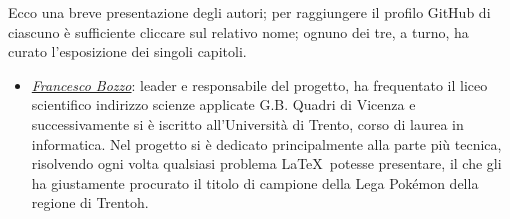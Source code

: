 \documentclass[class=book, crop=false, oneside]{standalone}
\begin{document}
Ecco una breve presentazione degli autori; per raggiungere il profilo GitHub di ciascuno è sufficiente cliccare sul relativo nome; ognuno dei tre, a turno, ha curato l'esposizione dei singoli capitoli.
\vskip 10pt
\begin{minipage}{.6\textwidth}
    \begin{itemize}
		\item \emph{\href{https://github.com/FrancescoBozzo}{Francesco Bozzo}}: leader e responsabile del progetto, ha frequentato il liceo scientifico indirizzo scienze applicate G.B. Quadri di Vicenza e successivamente si è iscritto all'Università di Trento, corso di laurea in informatica. Nel progetto si è dedicato principalmente alla parte più tecnica, risolvendo ogni volta qualsiasi problema \LaTeX\ potesse presentare, il che gli ha giustamente procurato il titolo di campione della Lega Pokémon della regione di Trentoh.
	\end{itemize}
\end{minipage}
\hspace{.1\textwidth}
\begin{minipage}{.4\textwidth}
	{%
		\setlength{\fboxsep}{0pt}%
		\setlength{\fboxrule}{1pt}%
	}%
\end{minipage}
\vskip 20pt
\end{document}
